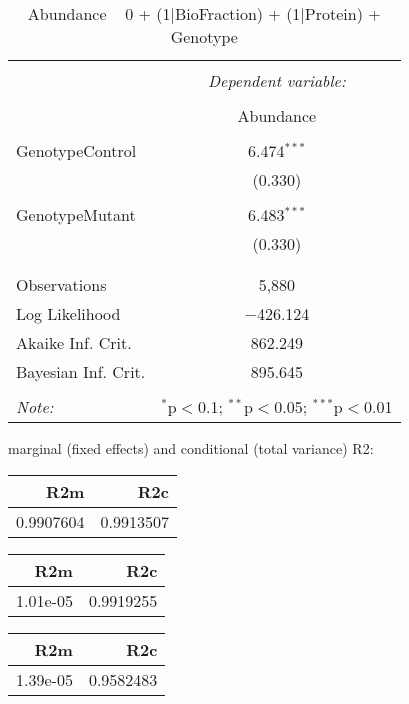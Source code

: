 \documentclass[11pt]{report}
\begin{document}
\begin{table}[!htbp] \centering 
  \caption{Abundance ~ 0 + (1|BioFraction) + (1|Protein) + Genotype} 
  \label{} 
\begin{tabular}{@{\extracolsep{5pt}}lc} 
\\[-1.8ex]\hline 
\hline \\[-1.8ex] 
 & \multicolumn{1}{c}{\textit{Dependent variable:}} \\ 
\cline{2-2} 
\\[-1.8ex] & Abundance \\ 
\hline \\[-1.8ex] 
 GenotypeControl & 6.474$^{***}$ \\ 
  & (0.330) \\ 
  & \\ 
 GenotypeMutant & 6.483$^{***}$ \\ 
  & (0.330) \\ 
  & \\ 
\hline \\[-1.8ex] 
Observations & 5,880 \\ 
Log Likelihood & $-$426.124 \\ 
Akaike Inf. Crit. & 862.249 \\ 
Bayesian Inf. Crit. & 895.645 \\ 
\hline 
\hline \\[-1.8ex] 
\textit{Note:}  & \multicolumn{1}{r}{$^{*}$p$<$0.1; $^{**}$p$<$0.05; $^{***}$p$<$0.01} \\ 
\end{tabular} 
\end{table} 
marginal (fixed effects) and conditional (total variance) R2:

\begin{tabular}{r|r}
\hline
R2m & R2c\\
\hline
0.9907604 & 0.9913507\\
\hline
\end{tabular}

\begin{tabular}{r|r}
\hline
R2m & R2c\\
\hline
1.01e-05 & 0.9919255\\
\hline
\end{tabular}

\begin{tabular}{r|r}
\hline
R2m & R2c\\
\hline
1.39e-05 & 0.9582483\\
\hline
\end{tabular}
\end{document}
